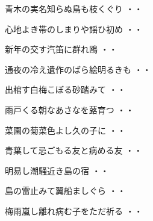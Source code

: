 \vspace{0.6cm}
\begin{shiika}青木の実名知らぬ鳥も枝くぐり
\hfill{・・}\end{shiika}
\vspace{0.6cm}
\begin{shiika}心地よき帯のしまりや謡ひ初め
\hfill{・・}\end{shiika}
\vspace{0.6cm}
\begin{shiika}新年の交す汽笛に群れ鴎
\hfill{・・}\end{shiika}
\vspace{0.6cm}
\begin{shiika}通夜の冷え遺作のばら絵明るきも
\hfill{・・}\end{shiika}
\vspace{0.6cm}
\begin{shiika}出棺す白梅こぼる砂踏みて
\hfill{・・}\end{shiika}
\vspace{0.6cm}
\begin{shiika}雨戸くる朝なあさなを蕗育つ
\hfill{・・}\end{shiika}
\vspace{0.6cm}
\begin{shiika}菜園の菊菜色よし久の子に
\hfill{・・}\end{shiika}
\vspace{0.6cm}
\begin{shiika}青葉して忌ごもる友と病める友
\hfill{・・}\end{shiika}
\vspace{0.6cm}
\begin{shiika}明易し潮騒近き島の宿
\hfill{・・}\end{shiika}
\vspace{0.6cm}
\begin{shiika}島の雷止みて翼船ましぐら
\hfill{・・}\end{shiika}
\vspace{0.6cm}
\begin{shiika}梅雨嵐し離れ病む子をただ祈る
\hfill{・・}\end{shiika}

